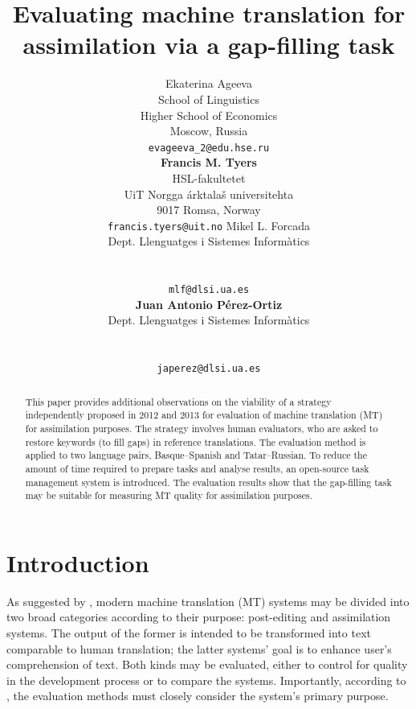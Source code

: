 \documentclass[11pt]{article}
\title{Evaluating machine translation for assimilation via a gap-filling task}
\author{{Ekaterina Ageeva}\\
  {School of Linguistics}\\
  {Higher School of Economics}\\
  {Moscow, Russia}\\
  {{\tt evageeva\_2@edu.hse.ru}}\\[2ex]
  {\textbf{Francis M. Tyers}}\\
  {HSL-fakultetet}\\ 
  {UiT Norgga \'{a}rktala\v{s} universitehta} \\
  {9017 Romsa, Norway} \\
  {{\tt francis.tyers@uit.no}}
  \And
  {Mikel L. Forcada}\\
  {Dept. Llenguatges i Sistemes Inform\`{a}tics}\\
  \blankout{Universitat d'Alacant} \\
  \blankout{E-03071 Alacant, Spain}\\
  {{\tt mlf@dlsi.ua.es}}  \\[2ex]
  {\textbf{Juan Antonio P\'{e}rez-Ortiz}} \\
  {Dept. Llenguatges i Sistemes Inform\`{a}tics}\\
  \blankout{Universitat d'Alacant} \\
  \blankout{E-03071 Alacant, Spain}\\
  {{\tt japerez@dlsi.ua.es}}
}
\date{}
\begin{document}
\maketitle
\renewcommand{\baselinestretch}{0.97} %
\begin{abstract}
  This paper provides additional observations on the viability of a
  strategy independently proposed in 2012 and 2013 for evaluation of
 machine translation (MT) for assimilation purposes. The strategy involves
  human evaluators, who are asked to restore keywords (to fill gaps) in
  reference translations. The evaluation method is applied to two language pairs, Basque--Spanish and Tatar--Russian. To reduce the amount of time required to prepare tasks
  and analyse results, an open-source task management system is
  introduced. The evaluation results show that the gap-filling task may be suitable for measuring MT
  quality for assimilation purposes.
\end{abstract}

\section{Introduction}

As suggested by \citet{church93}, modern machine translation (MT) systems may
be divided into two broad categories according to their purpose: post-editing and assimilation systems. The output of the former is intended to be transformed into text comparable to human translation; the latter systems' goal is to enhance user's comprehension of text. Both kinds may be evaluated, either to control for quality in the development process or to compare the systems. Importantly, according to \citet{church93}, the evaluation methods must closely consider the system's primary purpose.
\end{document}
